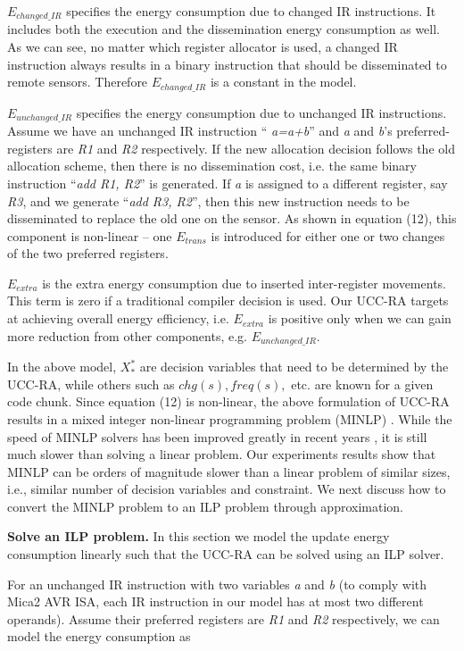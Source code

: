 $E_{changed\_IR}$ specifies the energy consumption due to changed IR
instructions. It includes both the execution and the dissemination
energy consumption as well. As we can see, no matter which register
allocator is used, a changed IR instruction always results in a binary
instruction that should be disseminated to remote sensors. Therefore
$E_{changed\_IR}$ is a constant in the model.

$E_{unchanged\_IR}$ specifies the energy consumption due to unchanged
IR instructions. Assume we have an unchanged IR instruction ``{\it
a=a+b}'' and {\it a} and {\it b}'s preferred-registers are {\it R1}
and {\it R2} respectively. If the new allocation decision follows the
old allocation scheme, then there is no dissemination cost, i.e. the
same binary instruction ``{\it add R1, R2}'' is generated. If {\it a}
is assigned to a different register, say {\it R3}, and we generate
``{\it add R3, R2}'', then this new instruction needs to be
disseminated to replace the old one on the sensor. As shown in
equation (12), this component is non-linear -- one $E_{trans}$ is
introduced for either one or two changes of the two preferred
registers.

$E_{extra}$ is the extra energy consumption due to inserted
inter-register movements. This term is zero if a traditional compiler
decision is used. Our UCC-RA targets at achieving overall energy efficiency,
i.e. $E_{extra}$ is positive only when we can gain more reduction from
other components, e.g. $E_{unchanged\_IR}$.

In the above model, $X_{*}^{*}$ are decision variables that need to be
determined by the UCC-RA, while others such as $chg(s), freq(s),$
etc.  are known for a given code chunk.  Since equation (12) is
non-linear, the above formulation of UCC-RA results in a mixed integer
non-linear programming problem (MINLP) \cite{bonmin}.  While the speed
of MINLP solvers has been improved greatly in recent years
\cite{bonmin}, it is still much slower than solving a linear problem.  Our
experiments results show that MINLP can be orders of magnitude slower
than a linear problem of similar sizes, i.e., similar number of
decision variables and constraint. We next discuss how to convert the
MINLP problem to an ILP problem through approximation.

\textbf{Solve an ILP problem.}
In this section we model the update energy consumption
linearly such that the UCC-RA can be solved using an ILP
solver. 

For an unchanged IR instruction with two variables {\it a} and {\it b}
(to comply with Mica2 AVR ISA, each IR instruction in our model has at
most two different operands). Assume their preferred registers are
{\it R1} and {\it R2} respectively, we can  model the energy consumption as

